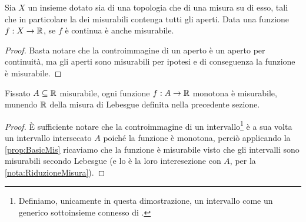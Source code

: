 \begin{remark}\label{nota:ContinueMisurabili}
	Sia $X$ un insieme dotato sia di una topologia che di una misura su di esso, tali che in particolare la \sigalg{} dei misurabili contenga tutti gli aperti.
	Data una funzione $f:X\to\mathbb R$, se $f$ è continua è anche misurabile.
\end{remark}
\begin{proof}
	Basta notare che la controimmagine di un aperto è un aperto per continuità, ma gli aperti sono misurabili per ipotesi e di conseguenza la funzione è misurabile.
\end{proof}

\begin{remark}\label{nota:MonotoneMisurabili}
	Fissato $A\subseteq \mathbb R$ misurabile, ogni funzione $f:A\to\mathbb R$ monotona è misurabile, munendo $\mathbb R$ della misura di Lebesgue definita nella precedente sezione.
\end{remark}
\begin{proof}
	È sufficiente notare che la controimmagine di un intervallo\footnote{Definiamo, unicamente in questa dimostrazione, un intervallo come un generico sottoinsieme connesso di \R.} è a sua volta un intervallo intersecato $A$ poiché la funzione è monotona, perciò applicando la \cref{prop:BasicMis} ricaviamo che la funzione è misurabile visto che gli intervalli sono misurabili secondo Lebesgue (e lo è la loro interesezione con $A$, per la \cref{nota:RiduzioneMisura}).
\end{proof}

